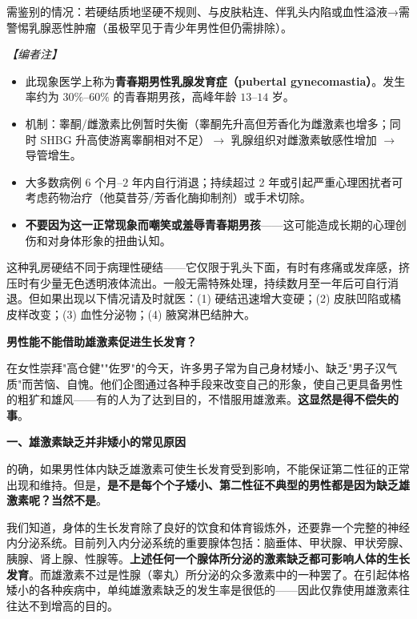 \documentclass[12pt,a4paper,twoside]{ctexbook}
\begin{document}
需鉴别的情况：若硬结质地坚硬不规则、与皮肤粘连、伴乳头内陷或血性溢液→需警惕乳腺恶性肿瘤（虽极罕见于青少年男性但仍需排除）。

\vspace{0.5em}
\noindent\textit{【编者注】}
\begin{itemize}
	\item 此现象医学上称为\textbf{青春期男性乳腺发育症（pubertal gynecomastia）}。发生率约为 $30\%$--$60\%$ 的青春期男孩，高峰年龄 $13$--$14$ 岁。
	\item 机制：睾酮/雌激素比例暂时失衡（睾酮先升高但芳香化为雌激素也增多；同时 SHBG 升高使游离睾酮相对不足）$\rightarrow$ 乳腺组织对雌激素敏感性增加 $\rightarrow$ 导管增生。
	\item 大多数病例 $6$ 个月--$2$ 年内自行消退；持续超过 2 年或引起严重心理困扰者可考虑药物治疗（他莫昔芬/芳香化酶抑制剂）或手术切除。
	\item \textbf{不要因为这一正常现象而嘲笑或羞辱青春期男孩}——这可能造成长期的心理创伤和对身体形象的扭曲认知。
\end{itemize}

\begin{tcolorbox}[colback=pink!5!white,colframe=red!50!black,title=贴心小叮咛]
这种乳房硬结不同于病理性硬结——它仅限于乳头下面，有时有疼痛或发痒感，挤压时有少量无色透明液体流出。一般无需特殊处理，持续数月至一年后可自行消退。但如果出现以下情况请及时就医：(1) 硬结迅速增大变硬；(2) 皮肤凹陷或橘皮样改变；(3) 血性分泌物；(4) 腋窝淋巴结肿大。
\end{tcolorbox}

\vspace{0.8em}
\noindent\textbf{男性能不能借助雄激素促进生长发育？}

在女性崇拜"高仓健""佐罗"的今天，许多男子常为自己身材矮小、缺乏"男子汉气质"而苦恼、自愧。他们企图通过各种手段来改变自己的形象，使自己更具备男性的粗犷和雄风——有的人为了达到目的，不惜服用雄激素。\textbf{这显然是得不偿失的事}。

\vspace{0.5em}
\noindent\textbf{一、雄激素缺乏并非矮小的常见原因}

的确，如果男性体内缺乏雄激素可使生长发育受到影响，不能保证第二性征的正常出现和维持。但是，\textbf{是不是每个个子矮小、第二性征不典型的男性都是因为缺乏雄激素呢？当然不是}。

我们知道，身体的生长发育除了良好的饮食和体育锻炼外，还要靠一个完整的神经内分泌系统。目前列入内分泌系统的重要腺体包括：脑垂体、甲状腺、甲状旁腺、胰腺、肾上腺、性腺等。\textbf{上述任何一个腺体所分泌的激素缺乏都可影响人体的生长发育}。而雄激素不过是性腺（睾丸）所分泌的众多激素中的一种罢了。在引起体格矮小的各种疾病中，单纯雄激素缺乏的发生率是很低的——因此仅靠使用雄激素往往达不到增高的目的。
\end{document}

